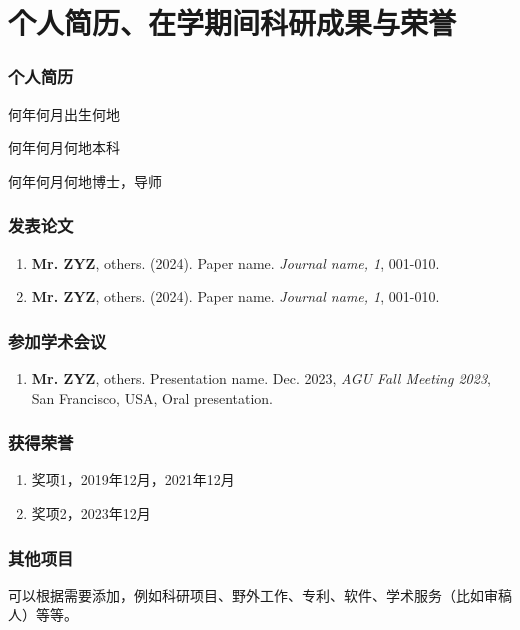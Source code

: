 \chapter*{个人简历、在学期间科研成果与荣誉}
{}

\subsection*{\bfseries 个人简历}

何年何月出生何地

何年何月何地本科

何年何月何地博士，导师

\subsection*{\bfseries 发表论文}

\setlength{\parskip}{6pt}
\renewcommand\labelenumi{[\theenumi]}

\begin{enumerate}
  \item \textbf{Mr. ZYZ}, others. (2024). Paper name. \textit{Journal name, 1}, 001-010. %
  \item \textbf{Mr. ZYZ}, others. (2024). Paper name. \textit{Journal name, 1}, 001-010. %
\end{enumerate}

\subsection*{\bfseries 参加学术会议}
\setlength{\parskip}{6pt}
\renewcommand\labelenumi{[\theenumi]}

\begin{enumerate}

    \item \textbf{Mr. ZYZ}, others. Presentation name. Dec. 2023, \textit{AGU Fall Meeting 2023}, San Francisco, USA, Oral presentation.

\end{enumerate}

\subsection*{\bfseries 获得荣誉}
\setlength{\parskip}{6pt}
\renewcommand\labelenumi{[\theenumi]}

\begin{enumerate}

  \item 奖项1，2019年12月，2021年12月
  \item 奖项2，2023年12月
\end{enumerate}

\subsection*{\bfseries 其他项目}
\setlength{\parskip}{6pt}
\renewcommand\labelenumi{[\theenumi]}

可以根据需要添加，例如科研项目、野外工作、专利、软件、学术服务（比如审稿人）等等。

